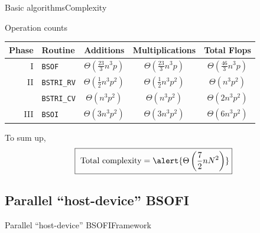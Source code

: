 \documentclass[xcolor=table,final]{beamer} %
\begin{document}
\begin{frame}{Basic algorithms}{Complexity}  
  \begin{block}{Operation counts}
    \begin{center}
      \begin{tabular}{r|l|c|c|c}
        \toprule
        Phase & Routine & Additions & Multiplications & Total Flops  \\
        \hline
        I&{\tt BSOF} & 
        $\displaystyle\Theta\left(\frac{23}{3} n^{3} p\right)$
        & $\displaystyle\Theta\left(\frac{23}{3} n^{3} p\right)$
        & $\displaystyle\Theta\left(\frac{46}{3} n^{3} p\right)$\\
        II&{\tt BSTRI\_RV} & 
        $\displaystyle\Theta\left(\frac{1}{2} n^3 p^{2}\right)$
        & $\displaystyle\Theta\left(\frac{1}{2} n^3 p^{2}\right)$
        & $\displaystyle\Theta\left(n^3 p^{2}\right)$\\
        \cline{2-5}
        &{\tt BSTRI\_CV} & 
        $\displaystyle\Theta\left(n^3 p^{2}\right)$
        & $\displaystyle\Theta \left(n^3 p^{2}\right)$
        & $\displaystyle\Theta \left(2 n^3 p^{2}\right)$\\
        III&{\tt BSOI} & 
        $\displaystyle\Theta \left(3 n^3 p^2\right)$
        & $\displaystyle\Theta \left(3 n^3 p^2\right)$
        & $\displaystyle\Theta \left(6 n^3 p^2\right)$\\
        \bottomrule  
      \end{tabular}
    \end{center}
    \pause
    To sum up, 
    \[
    \fbox{
      $\text{Total complexity} = \alert{\displaystyle\Theta\left(\frac{7}{2} n  N^2\right)}$}
    \]
  \end{block}
\end{frame}

\subsection{Parallel ``host-device'' BSOFI}

\begin{frame}{Parallel ``host-device'' BSOFI}{Framework}
  \resizebox{.75\width}{.75\height}{
    
  }
\end{frame}
\end{document}
